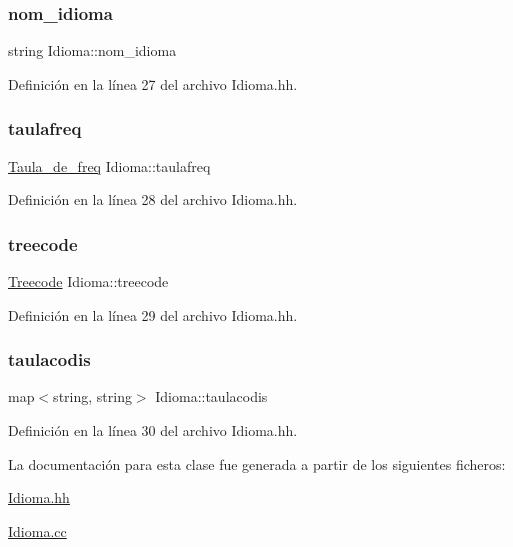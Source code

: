 \subsubsection{\texorpdfstring{nom\+\_\+idioma}{nom\_idioma}}
{\footnotesize\ttfamily string Idioma\+::nom\+\_\+idioma\hspace{0.3cm}{\ttfamily [private]}}



Definición en la línea 27 del archivo Idioma.\+hh.

\mbox{\label{class_idioma_a51e5f7366342e04f3dae8a4f0fdcca60}} 
\subsubsection{\texorpdfstring{taulafreq}{taulafreq}}
{\footnotesize\ttfamily \hyperlink{class_taula__de__freq}{Taula\+\_\+de\+\_\+freq} Idioma\+::taulafreq\hspace{0.3cm}{\ttfamily [private]}}



Definición en la línea 28 del archivo Idioma.\+hh.

\mbox{\label{class_idioma_ab80d7ef5fec4c922bc65e97e6e3bf968}} 
\subsubsection{\texorpdfstring{treecode}{treecode}}
{\footnotesize\ttfamily \hyperlink{class_treecode}{Treecode} Idioma\+::treecode\hspace{0.3cm}{\ttfamily [private]}}



Definición en la línea 29 del archivo Idioma.\+hh.

\mbox{\label{class_idioma_a8eb4228a5182a71efe31c110f2500723}} 
\subsubsection{\texorpdfstring{taulacodis}{taulacodis}}
{\footnotesize\ttfamily map$<$string, string$>$ Idioma\+::taulacodis\hspace{0.3cm}{\ttfamily [private]}}



Definición en la línea 30 del archivo Idioma.\+hh.



La documentación para esta clase fue generada a partir de los siguientes ficheros\+:\begin{DoxyCompactItemize}
\item 
\hyperlink{_idioma_8hh}{Idioma.\+hh}\item 
\hyperlink{_idioma_8cc}{Idioma.\+cc}\end{DoxyCompactItemize}

